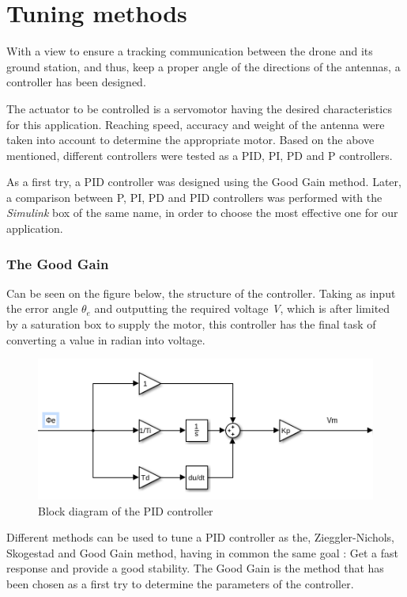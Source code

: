 \section{Tuning methods}
With a view to ensure a tracking communication between the drone and its ground station, and thus, keep a proper angle of the directions of the antennas, a controller has been designed.\par

The actuator to be controlled is a servomotor having the desired characteristics for this application.  Reaching speed, accuracy and weight of the antenna were taken into account to determine the appropriate motor. Based on the above mentioned, different controllers were tested as a PID, PI, PD and P controllers.\par 	
As a first try, a PID controller was designed using the Good Gain method. Later, a comparison between P, PI, PD and PID controllers was performed with the \emph{Simulink} box of the same name, in order to choose the most effective one for our application.\par 	

\subsubsection{The Good Gain}


Can be seen on the figure below, the structure of the controller. Taking as input the error angle \textbf{$\theta_{e}$} and outputting the required voltage \textit{V}, which is after limited by a saturation box to supply the motor, this controller has the final task of converting a value in radian into voltage.\par

\begin{figure}[H]
  \centering
  \includegraphics[scale=0.5]{figures/PID_2D.png}
  \caption[LABEL] {Block diagram of the PID controller}
\end{figure}
  
Different methods can be used to tune a PID controller as the, Zieggler-Nichols, Skogestad and Good Gain method, having in common the same goal : Get a fast response and provide a good stability. The Good Gain is the method that has been chosen as a first try to determine the parameters of the controller.\par
  
